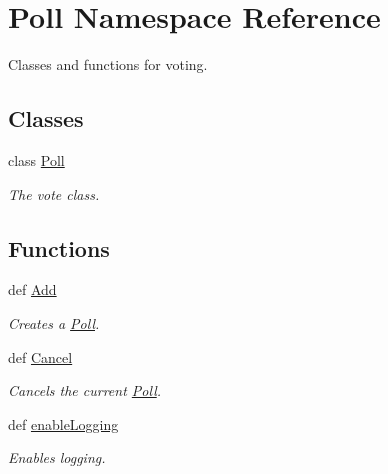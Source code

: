 \hypertarget{namespace_poll}{
\section{\-Poll \-Namespace \-Reference}
\label{namespace_poll}
}


\-Classes and functions for voting.  


\subsection*{\-Classes}
\begin{DoxyCompactItemize}
\item 
class \hyperlink{class_poll_1_1_poll}{\-Poll}
\begin{DoxyCompactList}\small\item\em \-The vote class. \end{DoxyCompactList}\end{DoxyCompactItemize}
\subsection*{\-Functions}
\begin{DoxyCompactItemize}
\item 
def \hyperlink{namespace_poll_a1efbfb31eb4d8136d2f290f0eaee2d21}{\-Add}
\begin{DoxyCompactList}\small\item\em \-Creates a \hyperlink{namespace_poll}{\-Poll}. \end{DoxyCompactList}\item 
def \hyperlink{namespace_poll_a19aa695ad336e36c6ff3d42d9ef15ae1}{\-Cancel}
\begin{DoxyCompactList}\small\item\em \-Cancels the current \hyperlink{namespace_poll}{\-Poll}. \end{DoxyCompactList}\item 
def \hyperlink{namespace_poll_a611264a388beae4d03f30fdd38caac99}{enable\-Logging}
\begin{DoxyCompactList}\small\item\em \-Enables logging. \end{DoxyCompactList}\end{DoxyCompactItemize}
